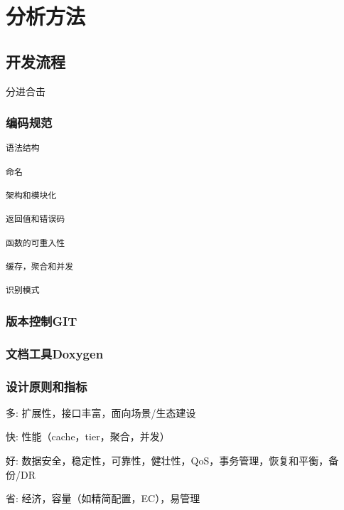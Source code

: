 \chapter{分析方法}

\section{开发流程}

分进合击

\subsection{编码规范}

\begin{lstlisting}
语法结构

命名

架构和模块化

返回值和错误码

函数的可重入性

缓存，聚合和并发

识别模式
\end{lstlisting}

\subsection{版本控制GIT}

\subsection{文档工具Doxygen}


\subsection{设计原则和指标}

\begin{itembox}
\item 多: 扩展性，接口丰富，面向场景/生态建设
\item 快: 性能（cache，tier，聚合，并发）
\item 好: 数据安全，稳定性，可靠性，健壮性，QoS，事务管理，恢复和平衡，备份/DR
\item 省: 经济，容量（如精简配置，EC），易管理
\end{itembox}

